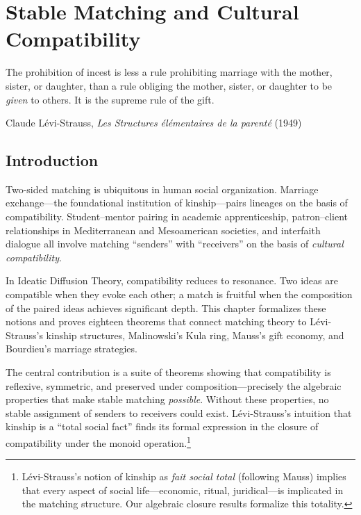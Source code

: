 
\chapter{Stable Matching and Cultural Compatibility}
\label{ch:matching}

\epigraph{The prohibition of incest is less a rule prohibiting marriage with
the mother, sister, or daughter, than a rule obliging the mother, sister, or
daughter to be \emph{given} to others.  It is the supreme rule of the gift.}%
{Claude Lévi-Strauss, \textit{Les Structures élémentaires de la parenté} (1949)}

\section{Introduction}

Two-sided matching is ubiquitous in human social organization.  Marriage
exchange---the foundational institution of kinship---pairs lineages on the
basis of compatibility.  Student--mentor pairing in academic apprenticeship,
patron--client relationships in Mediterranean and Mesoamerican societies,
and interfaith dialogue all involve matching ``senders'' with ``receivers''
on the basis of \emph{cultural compatibility}.

In Ideatic Diffusion Theory, compatibility reduces to resonance.  Two ideas
are compatible when they evoke each other; a match is fruitful when the
composition of the paired ideas achieves significant depth.  This chapter
formalizes these notions and proves eighteen theorems that connect matching
theory to Lévi-Strauss's kinship structures, Malinowski's Kula ring,
Mauss's gift economy, and Bourdieu's marriage strategies.

The central contribution is a suite of theorems showing that compatibility is
reflexive, symmetric, and preserved under composition---precisely the
algebraic properties that make stable matching \emph{possible}.  Without
these properties, no stable assignment of senders to receivers could exist.
Lévi-Strauss's intuition that kinship is a ``total social fact'' finds its
formal expression in the closure of compatibility under the monoid
operation.\footnote{Lévi-Strauss's notion of kinship as \emph{fait social
total} (following Mauss) implies that every aspect of social life---economic,
ritual, juridical---is implicated in the matching structure.  Our algebraic
closure results formalize this totality.}

